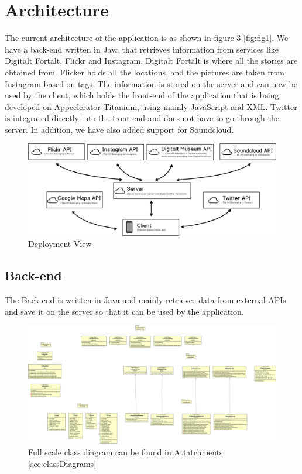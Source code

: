 \section{Architecture}
\thispagestyle{plain}

The current architecture of the application is as shown in figure 3 \ref{fig:fig1}. We have a back-end written in Java that retrieves information from services like Digitalt Fortalt, Flickr and Instagram. Digitalt Fortalt is where all the stories are obtained from. Flicker holds all the locations, and the pictures are taken from Instagram based on tags. The information is stored on the server and can now be used by the client, which holds the front-end of the application that is being developed on Appcelerator Titanium, using mainly JavaScript and XML. Twitter is integrated directly into the front-end and does not have to go through the server. In addition, we have also added support for Soundcloud. 

\vspace{0.4in}
\begin{figure}[!h]
\begin{center}
\includegraphics[width=1\textwidth]{res/DeploymentView.jpg}
\caption{Deployment View}
\end{center}
\end{figure}


\subsection{Back-end}
The Back-end is written in Java and mainly retrieves data from external APIs and save it on the server so that it can be used by the application.

\begin{figure}[!h]
\begin{center}
\includegraphics[scale=0.15]{classBack.jpg}
\caption[miniature class diagram: back-end]{Full scale class diagram can be found in Attatchments \ref{sec:classDiagrams}}
\end{center}
\end{figure}

